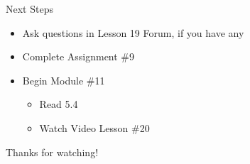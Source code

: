 \documentclass[t, aspectratio=169]{beamer}
\begin{document}
	\begin{frame}{Next Steps}
		\begin{itemize}
			\item Ask questions in Lesson 19 Forum, if you have any
			\item Complete Assignment \#9
			\item Begin Module \#11
			\begin{itemize}
				\item Read 5.4
				\item Watch Video Lesson \#20
			\end{itemize}
		\end{itemize}
	
		\vfill
		
		Thanks for watching!
	\end{frame}
\end{document}
